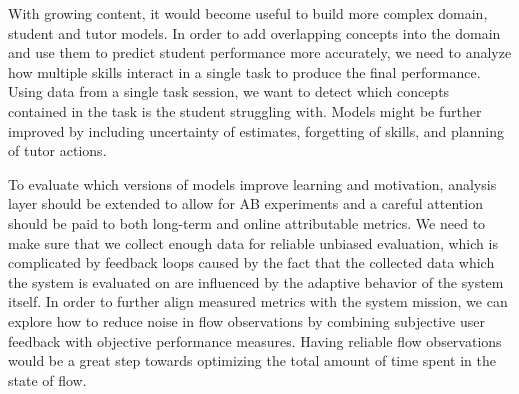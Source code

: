 With growing content, it would become useful to build more complex
domain, student and tutor models. In order to add overlapping concepts
into the domain and use them to predict student performance more accurately,
we need to analyze how multiple skills interact in a single
task to produce the final performance. %
Using data from a single task session,
we want to detect which concepts contained in the task
is the student struggling with.
Models might be further improved by including uncertainty of estimates,
forgetting of skills, and planning of tutor actions.

To evaluate which versions of models improve learning and motivation, %
analysis layer should be extended to allow for AB experiments
and a careful attention should be paid to both long-term and
online attributable metrics.
We need to make sure that we collect enough data for reliable unbiased evaluation,
which is complicated by feedback loops caused by the fact that
the collected data which the system is evaluated on are influenced by the
adaptive behavior of the system itself.
In order to further align measured metrics with the system mission,
we can explore how to reduce noise in flow observations
by combining subjective user feedback with objective performance measures.
Having reliable flow observations would be a great step towards optimizing
the total amount of time spent in the state of flow.



